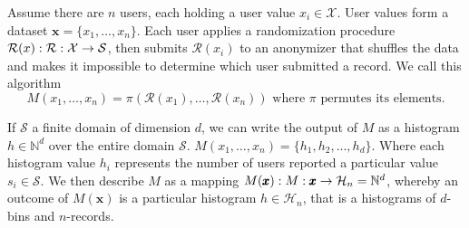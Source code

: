 \documentclass[11pt]{article}
\newcommand{\bbx}{\pmb{x}}
\newcommand{\cX}{\mathcal{X}}
\newcommand{\cR}{\mathcal{R}}
\newcommand{\N}{\mathbb{N}}
\newcommand{\Ssp}{\mathcal{S}}
\newcommand{\Hsp}{\mathcal{H}}
\begin{document}
Assume there are $n$ users, each holding a user value $x_i \in \cX$.  User values form a dataset $\bbx = \{x_1,\dots ,x_n\}$. Each user applies a randomization procedure $\cR(x): \map{\cR}{\cX}{\Ssp}$, then submits $\cR(x_i)$ to an anonymizer that shuffles the data and makes it impossible to determine which user submitted a record. We call this algorithm 
\[
M(x_1,  \dots , x_n) = \pi (\cR(x_1), \dots , \cR(x_n)) \text{ where } \pi \text{ permutes its elements}. 
\]

If $\Ssp$ a finite domain of dimension $d$,  we can write the output of $M$ as a histogram $h \in \N^d$ over the entire domain $\Ssp$.   $M(x_1,  \dots , x_n) = \{h_1, h_2, ..., h_d\}$. Where each histogram value $h_i$ represents the number of users reported a particular value $s_i \in  \Ssp$.   We then describe $M$ as a mapping $M(\bbx):\map{M}{\bbx}{\Hsp_n = \N^d}$, whereby an outcome of $M(\bbx)$ is a particular histogram $h \in \Hsp_n$, that is a histograms of $d$-bins and $n$-records.
\end{document}
